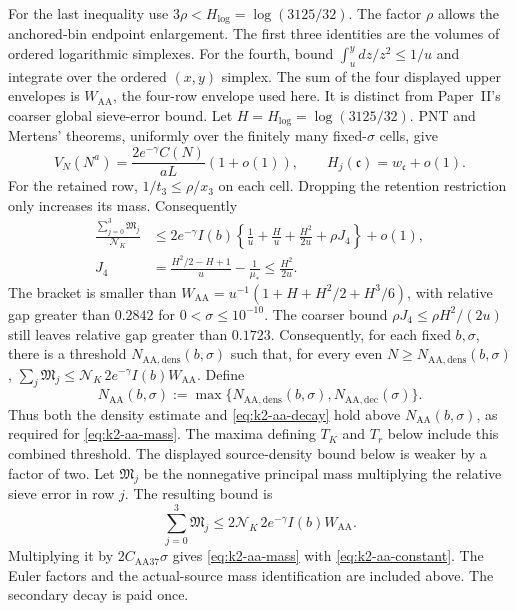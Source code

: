 For the last inequality use \(3\rho<H_{\log}=\log(3125/32)\).
The factor \(\rho\) allows the anchored-bin endpoint enlargement. The first three
identities are the volumes of ordered logarithmic simplexes. For the
fourth, bound \(\int_u^y dz/z^2\le1/u\) and integrate over the ordered
\((x,y)\) simplex. The sum of the four displayed upper envelopes is \(W_{\mathrm{AA}}\),
the four-row envelope used here. It is distinct from Paper~II's
coarser global sieve-error bound.
Let \(H=H_{\log}=\log(3125/32)\). PNT and Mertens' theorems, uniformly
over the finitely many fixed-\(\sigma\) cells, give
\[
 V_N(N^a)=\frac{2e^{-\gamma}C(N)}{aL}(1+o(1)),\qquad
 H_j(\mathfrak c)=w_{\mathfrak c}+o(1).
\]
For the retained row, \(1/t_3\le\rho/x_3\) on each cell. Dropping
the retention restriction only increases its mass. Consequently
\begin{equation}\label{eq:k2-aa-density-derived}
\begin{aligned}
 \frac{\sum_{j=0}^3\mathfrak M_j}{\mathcal N_K}
 &\le2e^{-\gamma}I(b)
 \left\{\frac1u+\frac{H}{u}+\frac{H^2}{2u}+\rho J_4\right\}+o(1),\\
 J_4&=\frac{H^2/2-H+1}{u}-\frac1{\mu_*}
       \le\frac{H^2}{2u}.
\end{aligned}
\end{equation}
The bracket is smaller than
\(W_{\mathrm{AA}}=u^{-1}(1+H+H^2/2+H^3/6)\), with relative gap greater
than \(0.2842\) for \(0<\sigma\le10^{-10}\). The coarser bound
\(\rho J_4\le\rho H^2/(2u)\) still leaves relative gap greater than \(0.1723\).
Consequently, for each fixed \(b,\sigma\), there is a threshold
\(N_{\mathrm{AA,dens}}(b,\sigma)\) such that, for every even
\(N\ge N_{\mathrm{AA,dens}}(b,\sigma)\),
\(\sum_j\mathfrak M_j\le\mathcal N_K\,2e^{-\gamma}I(b)W_{\mathrm{AA}}\).
Define
\[
 N_{\mathrm{AA}}(b,\sigma)
 :=\max\{N_{\mathrm{AA,dens}}(b,\sigma),N_{\mathrm{AA,dec}}(\sigma)\}.
\]
Thus both the density estimate and \eqref{eq:k2-aa-decay} hold above
\(N_{\mathrm{AA}}(b,\sigma)\), as required for \eqref{eq:k2-aa-mass}.
The maxima defining \(T_K\) and \(T_r\) below include this combined threshold.
The displayed source-density bound below is weaker by a factor of two.
Let \(\mathfrak M_j\) be the nonnegative principal mass multiplying the
relative sieve error in row \(j\). The resulting bound is
\begin{equation}\label{eq:k2-aa-density-mass}
 \sum_{j=0}^3\mathfrak M_j\le
 2\mathcal N_K\,2e^{-\gamma}I(b)W_{\mathrm{AA}}.
\end{equation}
Multiplying it by
\(2C_{\mathrm{AA37}}\sigma\) gives \eqref{eq:k2-aa-mass} with
\eqref{eq:k2-aa-constant}. The Euler factors and the actual-source mass
identification are included above. The secondary decay is paid once.


